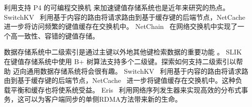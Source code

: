 利用支持 P4 \cite{bosshart2014p4} 的可编程交换机 \cite{barefoot-tofino} 来加速键值存储系统也是近年来研究的热点。
SwitchKV~\cite {li2016fast} 利用基于内容的路由将请求路由到基于缓存键的后端节点，NetCache~ \cite {netcache-sosp17} 进一步将访问频繁的键值缓存在交换机中。
NetChain~\cite{jin2018netchain} 在网络交换机中实现了一个高一致性、容错的键值存储。

数据存储系统中二级索引是通过主键以外地其他键检索数据的重要功能 \cite {escriva2012hyperdex,kejriwal2016slik}。 SLIK~ \cite {kejriwal2016slik}在键值存储系统中使用 B+ 树算法支持多个二级键。探索如何支持二级索引以帮助 \oursys{} 迈向通用数据存储系统将会很有趣。 SwitchKV~ \cite {li2016fast}利用基于内容的路由将请求路由到基于缓存键的后端节点，NetCache~ \cite {netcache-sosp17}进一步将键值缓存在交换机中。这种负载平衡和缓存也将使系统受益。
Eris~ \cite {eris}利用网络序列发生器来实现高效的分布式事务，这可以为客户端同步的单侧RDMA方法带来新的生命。









